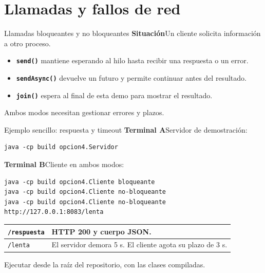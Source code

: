 \bloque{\personaCuatro}
\section{Llamadas y fallos de red}
\begin{frame}{Llamadas bloqueantes y no bloqueantes}\relax
\small
\textbf{Situación}\quad Un cliente solicita información a otro proceso.
\medskip
\begin{itemize}
  \item \textbf{\texttt{send()}} mantiene esperando al hilo hasta recibir una respuesta o un error.
  \item \textbf{\texttt{sendAsync()}} devuelve un futuro y permite continuar antes del resultado.
  \item \textbf{\texttt{join()}} espera al final de esta demo para mostrar el resultado.
\end{itemize}
\medskip
Ambos modos necesitan gestionar errores y plazos. \cite{java17httpclient,java17httprequest}
\end{frame}

\begin{frame}[fragile]{Ejemplo sencillo: respuesta y timeout}
\small
\textbf{Terminal A}\quad Servidor de demostración:
{\scriptsize
\begin{verbatim}
java -cp build opcion4.Servidor
\end{verbatim}
}
\textbf{Terminal B}\quad Cliente en ambos modos:
{\scriptsize
\begin{verbatim}
java -cp build opcion4.Cliente bloqueante
java -cp build opcion4.Cliente no-bloqueante
java -cp build opcion4.Cliente no-bloqueante http://127.0.0.1:8083/lenta
\end{verbatim}
}
\begin{tabularx}{\linewidth}{|l|X|}
\hline
\texttt{/respuesta} & HTTP 200 y cuerpo JSON.\\\hline
\texttt{/lenta} & El servidor demora 5 s. El cliente agota su plazo de 3 s.\\\hline
\end{tabularx}
\medskip
{\footnotesize Ejecutar desde la raíz del repositorio, con las clases compiladas.}
\end{frame}


